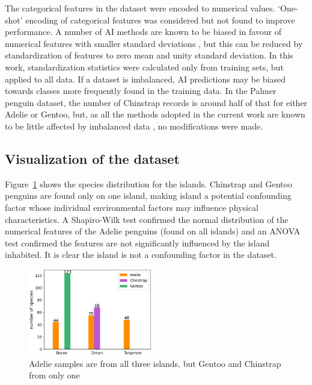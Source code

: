 \documentclass[12pt]{article}
\begin{document}
The categorical features in the dataset were encoded to numerical values. `One-shot' encoding of 
categorical features was considered but not found to 
improve performance. A number of AI methods are known to be biased in favour of numerical features 
with smaller standard deviations \cite{hastie2009elements}, but this can be reduced by standardization 
of features to zero mean and unity standard deviation. In this work, 
standardization statistics were calculated only from training sets, but applied to all data. 
If a dataset is imbalanced, 
AI predictions may be biased towards classes more frequently found in the training data. 
In the Palmer penguin dataset, the number of Chinstrap records is around half of that for either Adelie or Gentoo, 
but, as all the methods adopted in the current work are known to be little affected by 
imbalanced data \cite{he2009learning}, no modifications were made.

\subsection*{Visualization of the dataset}

Figure~\ref{fig:islands} shows the species distribution for the islands. 
Chinstrap and Gentoo penguins are found only on one island, making island a potential confounding factor whose 
individual environmental factors may influence physical characteristics. 
A Shapiro-Wilk test confirmed the normal distribution of the numerical features of the Adelie penguins (found on 
all islands) and an ANOVA test confirmed the features are not significantly influenced by the island inhabited. 
It is clear the island is not a confounding factor in the dataset.

\begin{figure} %
  \centering
  \vspace{-1.5\baselineskip} %
  \includegraphics[width=0.48\textwidth]{islands.png} %
  \vspace{-0.5\baselineskip} %
  \caption{\centering\linespread{0.8}\selectfont Adelie samples are from all three islands, but Gentoo and Chinstrap from only one}
  \vspace{-1.5\baselineskip} %
  \label{fig:islands}
\end{figure}
\end{document}
